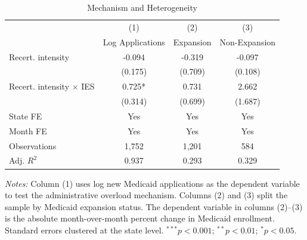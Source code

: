 \begin{table}[t]
\centering
\caption{Mechanism and Heterogeneity}
\label{tab:mechanism}
\begin{tabular}{lccc}
\hline\hline
 & (1) & (2) & (3) \\
 & Log Applications & Expansion & Non-Expansion \\
\hline
Recert. intensity & -0.094 & -0.319 & -0.097 \\
 & (0.175) & (0.709) & (0.108) \\
Recert. intensity $\times$ IES & 0.725* & 0.731 & 2.662 \\
 & (0.314) & (0.699) & (1.687) \\
\addlinespace
State FE & Yes & Yes & Yes \\
Month FE & Yes & Yes & Yes \\
Observations & 1,752 & 1,201 & 584 \\
Adj. $R^2$ & 0.937 & 0.293 & 0.329 \\
\hline\hline
\end{tabular}
\begin{tablenotes}
\item \textit{Notes:} Column (1) uses log new Medicaid applications as the dependent variable to test the administrative overload mechanism. Columns (2) and (3) split the sample by Medicaid expansion status. The dependent variable in columns (2)--(3) is the absolute month-over-month percent change in Medicaid enrollment. Standard errors clustered at the state level. $^{***}p<0.001$; $^{**}p<0.01$; $^{*}p<0.05$.
\end{tablenotes}
\end{table}

